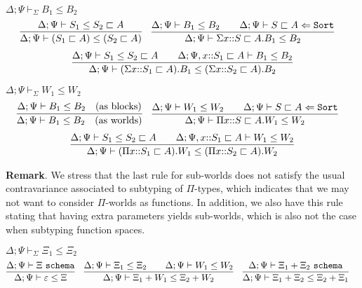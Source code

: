 \documentclass[letterpaper, 11pt]{article}
\newcommand{\Lar}{\Leftarrow}
\newcommand{\Sort}{\texttt{Sort}}
\newcommand{\schema}{\texttt{schema}}
\begin{document}
    $\boxed{\Delta; \Psi \vdash_\Sigma B_1 \leq B_2}$
    \begin{align*}
      & \infer{\Delta; \Psi \vdash (S_1 \sqsubset A) \leq (S_2 \sqsubset A)}
              {
                \Delta; \Psi \vdash S_1 \leq S_2 \sqsubset A
              } &
      & \infer{\Delta; \Psi \vdash \Sigma x{::}S \sqsubset A. B_1 \leq B_2}
              {
                \Delta ; \Psi \vdash B_1 \leq B_2
                &&
                \Delta; \Psi \vdash S \sqsubset A \Lar \Sort
              }
    \end{align*}
    \begin{align*}
      \infer{\Delta; \Psi \vdash (\Sigma x{::} S_1 \sqsubset A).B_1 \leq (\Sigma x{::}S_2 \sqsubset A). B_2 }
            {
              \Delta; \Psi \vdash S_1 \leq S_2 \sqsubset A
              &&
              \Delta; \Psi, x{::}S_1 \sqsubset A \vdash B_1 \leq B_2
            }
    \end{align*}

    $\boxed{ \Delta; \Psi \vdash_\Sigma W_1 \leq W_2}$ \\
    \begin{align*}
      & \infer{\Delta; \Psi \vdash B_1 \leq B_2 \quad (\text{as worlds})}
              {
                \Delta; \Psi \vdash B_1 \leq B_2 \quad ( \text{as blocks})
              } &
      & \infer{\Delta; \Psi \vdash \Pi x{::}S \sqsubset A. W_1 \leq W_2}
              {
                \Delta ; \Psi \vdash W_1 \leq W_2
                &&
                \Delta; \Psi \vdash S \sqsubset A \Lar \Sort
              }
    \end{align*}
    \begin{align*}
      \infer{\Delta; \Psi \vdash (\Pi x{::} S_1 \sqsubset A).W_1 \leq (\Pi x{::}S_2 \sqsubset A). W_2 }
            {
              \Delta; \Psi \vdash S_1 \leq S_2 \sqsubset A
              &&
              \Delta; \Psi, x{::}S_1 \sqsubset A \vdash W_1 \leq W_2
            }
    \end{align*}

    \textbf{Remark}.  We stress that the last rule for sub-worlds does not satisfy the usual contravariance associated to subtyping of $\Pi$-types, which
    indicates that we may not want to consider $\Pi$-worlds as functions.  In addition, we also have this rule stating that having extra parameters yields
    sub-worlds, which is also not the case when subtyping function spaces.
    
    $\boxed{ \Delta; \Psi \vdash_\Sigma \Xi_1 \leq \Xi_2}$
    \begin{align*}
      & \infer{\Delta; \Psi \vdash \varepsilon \leq \Xi}{\Delta; \Psi \vdash \Xi \ \schema} &
      & \infer{\Delta; \Psi \vdash \Xi_1 + W_1 \leq \Xi_2 + W_2}
        {
          \Delta; \Psi \vdash \Xi_1 \leq \Xi_2
          &&
          \Delta; \Psi \vdash W_1 \leq W_2
        } &
      & \infer{\Delta; \Psi \vdash \Xi_1 + \Xi_2 \leq \Xi_2 + \Xi_1}{\Delta; \Psi \vdash \Xi_1 + \Xi_2 \ \schema}
    \end{align*}
\end{document}
